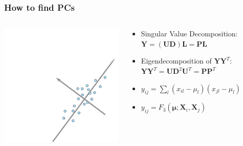 \documentclass[11pt]{beamer}
\newcommand{\MX}{\mathbf{X}} %
\newcommand{\MY}{\mathbf{Y}} %
\newcommand{\MP}{\mathbf{P}} %
\newcommand{\MEAN}{\boldsymbol{\mu}} %
\begin{document}
\begin{frame}
\frametitle{How to find PCs}
\begin{columns}
\begin{column}{0.4\textwidth}
	\includegraphics[width=\textwidth]{figures/pca3.pdf}
\end{column}
\begin{column}{0.6\textwidth}
	\begin{itemize}
		\item<1-> Singular Value Decomposition: $\MY = (\mathbf{U}\mathbf{D})\mathbf{L} = \mathbf{P}\mathbf{L}$
		\item<2-> Eigendecomposition of $\MY\MY^T$: $\MY\MY^T = \mathbf{U}\mathbf{D}^2\mathbf{U}^T = \MP\MP^T$
		\only<3>{\item $y_{ij}$}
		\item<4-> $y_{ij} = \sum_l (x_{il} - \mu_l)(x_{jl} - \mu_l)$
		\item<5-> $y_{ij} = F_3(\MEAN; \MX_i, \MX_j)$
	\end{itemize}
\end{column}			
\end{columns}
\vspace{30px}
\end{frame}
\end{document}
